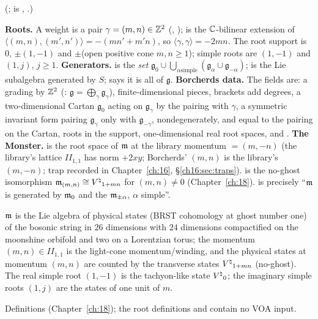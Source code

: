 (;  is
, .)
\begin{dictionary}
\textbf{Roots.}  A weight is a pair $\gamma=(m,n)\in{\mathbb{Z}}^2$ (, );  is
the ${\mathbb{C}}$-bilinear extension of $\langle(m,n),(m',n')\rangle=-(mn'+m'n)$, so $\langle\gamma,\gamma\rangle=-2mn$.  The root
support is $0$, $\pm(1,-1)$ and $\pm$(open positive cone $m,n\ge1$); simple roots are $(1,-1)$ and $(1,j)$, $j\ge1$.
\textbf{Generators.}   is the \emph{set} $\mathfrak g_0\cup\bigcup_{\alpha\text{
simple}}(\mathfrak g_\alpha\cup\mathfrak g_{-\alpha})$;  is the Lie subalgebra generated by $S$;
 says it is all of $\mathfrak g$.  \textbf{Borcherds data.}  The fields are: a grading by ${\mathbb{Z}}^2$
(: $\mathfrak g=\bigoplus_\gamma\mathfrak g_\gamma$), finite-dimensional pieces, brackets add
degrees, a two-dimensional Cartan $\mathfrak g_0$ acting on $\mathfrak g_\gamma$ by the pairing with $\gamma$, a symmetric
invariant form pairing $\mathfrak g_\gamma$ only with $\mathfrak g_{-\gamma}$, nondegenerately, and equal to the pairing on
the Cartan, roots in the support, one-dimensional real root spaces, and .  \textbf{The Monster.}
 is the root space of $\mathfrak m$ at the library momentum 
$=(m,-n)$ (the library's lattice $I\!I_{1,1}$ has norm $+2xy$; Borcherds' $(m,n)$ is the library's $(m,-n)$; trap recorded in
Chapter~\ref{ch:16}, \S\ref{ch16:sec:traps}).   is the no-ghost isomorphism
$\mathfrak m_{(m,n)}\cong{V^{\natural}}_{1+mn}$ for $(m,n)\ne0$ (Chapter~\ref{ch:18}).   is
precisely ``$\mathfrak m$ is generated by $\mathfrak m_0$ and the $\mathfrak m_{\pm\alpha}$, $\alpha$ simple''.
\end{dictionary}
\begin{physics}
$\mathfrak m$ is the Lie algebra of physical states (BRST cohomology at ghost number one) of the bosonic string in $26$
dimensions with $24$ dimensions compactified on the moonshine orbifold and two on a Lorentzian torus; the momentum
$(m,n)\in I\!I_{1,1}$ is the light-cone momentum/winding, and the physical states at momentum $(m,n)$ are counted by the
transverse states ${V^{\natural}}_{1+mn}$ (no-ghost).  The real simple root $(1,-1)$ is the tachyon-like state ${V^{\natural}}_0$; the
imaginary simple roots $(1,j)$ are the states of one unit of $m$.
\end{physics}
\begin{status}
Definitions (Chapter~\ref{ch:18}); the root definitions and  contain no VOA input.
\end{status}


